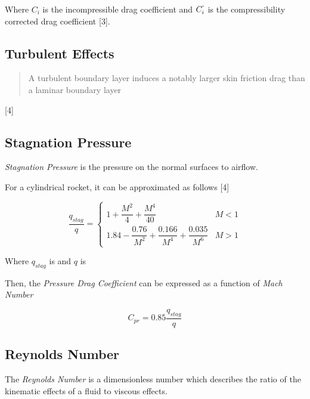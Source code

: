 \documentclass[]{article}
\begin{document}

Where \(C_i\) is the incompressible drag coefficient and \(C^`_i\) is
the compressibility corrected drag coefficient {[}3{]}.

\subsection{Turbulent Effects}\label{turbulent-effects}

\begin{quote}
A turbulent boundary layer induces a notably larger skin friction drag
than a laminar boundary layer
\end{quote}

{[}4{]}

\subsection{Stagnation Pressure}\label{stagnation-pressure}

\emph{Stagnation Pressure} is the pressure on the normal surfaces to
airflow.

For a cylindrical rocket, it can be approximated as follows {[}4{]}

\begin{equation}
\label{eq_stagnation_pressure_blunt_cylinder}
\dfrac{q_{stag}}{q} =  
\begin{cases}
    1 + \dfrac{M^2}{4} + \dfrac{M^4}{40}                                    & M < 1 \\
    1.84 - \dfrac{0.76}{M^2} + \dfrac{0.166}{M^4} + \dfrac{0.035}{M^6}      & M > 1
\end{cases}
\end{equation}

Where \(q_{stag}\) is and \(q\) is

Then, the \emph{Pressure Drag Coefficient} can be expressed as a
function of \emph{Mach Number}

\begin{equation}
\label{eq_pressure_drag_coefficient}
C_{pr} = 0.85 \dfrac{q_{stag}}{q}
\end{equation}

\subsection{Reynolds Number}\label{reynolds-number}

The \emph{Reynolds Number} is a dimensionless number which describes the
ratio of the kinematic effects of a fluid to viscous effects.
\end{document}
